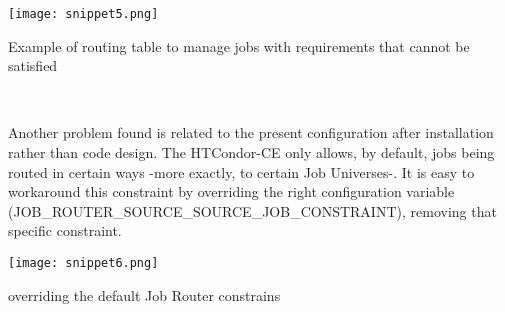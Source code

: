 \documentclass[a4paper]{jpconf}
\begin{document}
\begin{snippet}[h]
    \centering
    \renewcommand\figurename{Snippet}
    \texttt{[image: snippet5.png]}
    \caption{Example of routing table to manage jobs with requirements that cannot be satisfied}
    \label{snip:snippet5}
\end{snippet}


~

Another problem found is related to the present configuration after installation rather than code design. 
The HTCondor-CE only allows, by default, jobs being routed in certain ways -more exactly, to certain Job Universes-.
It is easy to workaround this constraint by overriding the right configuration
variable (JOB\_ROUTER\_SOURCE\_SOURCE\_JOB\_CONSTRAINT), removing that specific
constraint.

\begin{snippet}[h]
    \centering
    \renewcommand\figurename{Snippet}
    \texttt{[image: snippet6.png]}
    \caption{overriding the default Job Router constrains}
    \label{snip:snippet6}
\end{snippet}

\end{document}
